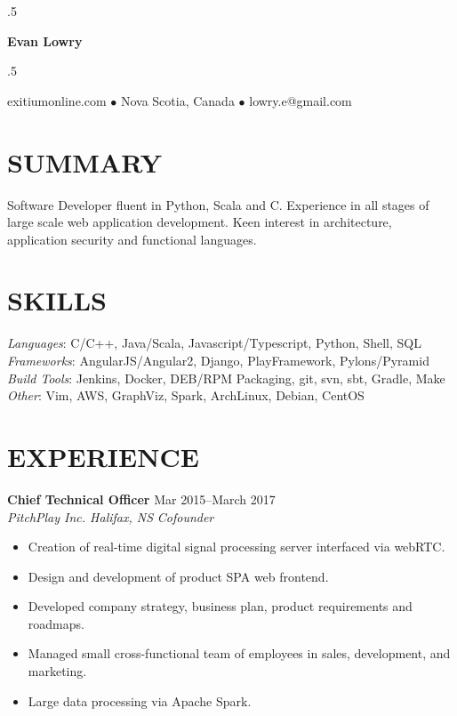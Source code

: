 \documentclass[line,margin]{res}
\begin{document}
\moveleft.5\hoffset\centerline{\LARGE\bf Evan Lowry}
\moveleft.5\hoffset\centerline{exitiumonline.com   {$\bullet$}   Nova Scotia, Canada {$\bullet$}   lowry.e@gmail.com}
 
\begin{resume}
\section{SUMMARY}
Software Developer fluent in Python, Scala and C. Experience in all stages of
large scale web application development. Keen interest in architecture, 
application security and functional languages.

\section{SKILLS}
\textit{Languages}: C/C++, Java/Scala, Javascript/Typescript, Python, Shell, SQL \\
\textit{Frameworks}: AngularJS/Angular2, Django, PlayFramework, Pylons/Pyramid  \\
\textit{Build Tools}: Jenkins, Docker, DEB/RPM Packaging, git, svn, sbt, Gradle, Make \\
\textit{Other}: Vim, AWS, GraphViz, Spark, ArchLinux, Debian, CentOS

\section{EXPERIENCE}
\textbf{Chief Technical Officer} \hfill Mar 2015--March 2017 \\
\textit{PitchPlay Inc. Halifax, NS} \hfill \textit{Cofounder}
\begin{itemize} \itemsep-2pt
    \item Creation of real-time digital signal processing server interfaced via webRTC.
    \item Design and development of product SPA web frontend.
    \item Developed company strategy, business plan, product requirements and roadmaps.
    \item Managed small cross-functional team of employees in sales, development, and marketing.
    \item Large data processing via Apache Spark.
\end{itemize}


\end{resume}
\end{document}
